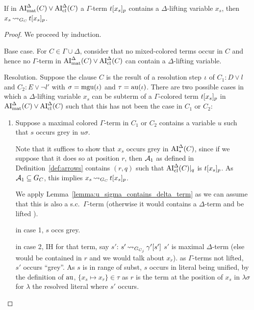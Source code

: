 \documentclass[,%
	paper=a4,%
	DIV11, %
	twoside=false,%
	liststotoc,
	bibtotoc,
	draft=false,%
	numbers=noendperiod
]{scrartcl}
\begin{document}
\begin{lemma}
	If in $\operatorname{AI}_\mathrm{mat}^\Delta(C) \lor \operatorname{AI}_\mathrm{cl}^\Delta(C)$ a
	$\Gamma$-term $t{[x_s]_{p}}$ contains a $\Delta$-lifting variable $x_s$, then $x_s \operatorname{\leadsto}_{G_C} t{[x_s]_{p}}$.
\end{lemma}
\begin{proof}
	We proceed by induction.

	\begin{description}
		\item{}Base case.
			For $C \in \Gamma\cup\Delta$, consider that no mixed-colored terms occur in $C$ and hence no $\Gamma$-term in $\operatorname{AI}_\mathrm{mat}^\Delta(C) \lor \operatorname{AI}_\mathrm{cl}^\Delta(C)$ can contain a $\Delta$-lifting variable.

		\item{}Resolution.
			Suppose the clause $C$ is the result of a resolution step $\iota$ of $C_1: D \lor l$ and $C_2: E \lor \lnot l'$ with $\sigma = \operatorname{mgu}(\iota)$ and $\tau = \operatorname{au}(\iota)$.
			There are two possible cases in which a $\Delta$-lifting variable $x_s$ can be subterm of a $\Gamma$-colored term $t{[x_s]_{p}}$ in $\operatorname{AI}_\mathrm{mat}^\Delta(C)\lor \operatorname{AI}_\mathrm{cl}^\Delta(C)$ such that this has not been the case in $C_1$ or $C_2$:

			\begin{enumerate}

				\item Suppose a maximal colored $\Gamma$-term in $C_1$ or $C_2$ contains a variable $u$ such that $s$ occurs grey in $u\sigma$.
					\label{25_1}

					Note that it suffices to show that $x_s$ occurs grey in $\operatorname{AI}_\mathrm{*}^\Delta(C)$,
					since if we suppose that it does so at position $r$,
					then $\operatorname{\mathcal{A}}_1$ as defined in Definition~\ref{def:arrows} contains $(r, q)$ such that $\operatorname{AI}_\mathrm{cl}^\Delta(C)|_{q}$ is $t{[x_s]_{p}}$.
					As $\operatorname{\mathcal{A}}_1 \subseteq G_C$, this implies $x_s \operatorname{\leadsto}_{G_C} t{[x_s]_{p}}$.

					We apply Lemma~\ref{lemma:u_sigma_contains_delta_term} as we can assume that this is also a s.c.\ $\Gamma$-term (otherwise it would contains a $\Delta$-term and be lifted ).

					in case 1, $s$ occs grey.

					in case 2, IH for that term, say $s'$: $s' \operatorname{\leadsto}_{G_{C_j}} \gamma'[s']$
					$s'$ is maximal $\Delta$-term (else would be contained in $r$ and we would talk about $x_r$).
					as $\Gamma$-terms not lifted, $s'$ occurs ``grey''.
					As $s$ is in range of subst, $s$ occurs in literal being unified,
					by the definition of $\operatorname{au}$, $\{x_s \mapsto x_r\} \in \tau$
					as $r$ is the term at the position of $x_s$ in $\lambda\sigma$ for $\lambda$ the resolved literal where $s'$ occurs.


\end{enumerate}
\end{description}
\end{proof}
\end{document}
